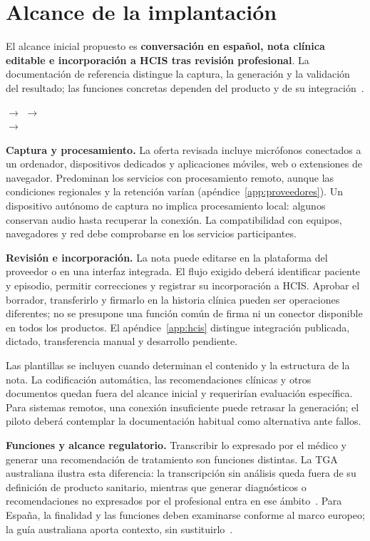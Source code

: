 \section{Alcance de la implantación}
\label{sec:flujo}
El alcance inicial propuesto es \textbf{conversación en español, nota clínica editable e incorporación a HCIS tras revisión profesional}. La documentación de referencia distingue la captura, la generación y la validación del resultado; las funciones concretas dependen del producto y de su integración~\cite{7MXFHMBA,nhsAmbient2025}.

\begin{center}
\small
{} $\longrightarrow$ 
$\longrightarrow$ \\[6pt]
$\longrightarrow$ 
\end{center}

\textbf{Captura y procesamiento.} La oferta revisada incluye micrófonos conectados a un ordenador, dispositivos dedicados y aplicaciones móviles, web o extensiones de navegador. Predominan los servicios con procesamiento remoto, aunque las condiciones regionales y la retención varían (apéndice~\ref{app:proveedores}). Un dispositivo autónomo de captura no implica procesamiento local: algunos conservan audio hasta recuperar la conexión. La compatibilidad con equipos, navegadores y red debe comprobarse en los servicios participantes.

\textbf{Revisión e incorporación.} La nota puede editarse en la plataforma del proveedor o en una interfaz integrada. El flujo exigido deberá identificar paciente y episodio, permitir correcciones y registrar su incorporación a HCIS. Aprobar el borrador, transferirlo y firmarlo en la historia clínica pueden ser operaciones diferentes; no se presupone una función común de firma ni un conector disponible en todos los productos. El apéndice~\ref{app:hcis} distingue integración publicada, dictado, transferencia manual y desarrollo pendiente.

Las plantillas se incluyen cuando determinan el contenido y la estructura de la nota. La codificación automática, las recomendaciones clínicas y otros documentos quedan fuera del alcance inicial y requerirían evaluación específica. Para sistemas remotos, una conexión insuficiente puede retrasar la generación; el piloto deberá contemplar la documentación habitual como alternativa ante fallos.

\textbf{Funciones y alcance regulatorio.} Transcribir lo expresado por el médico y generar una recomendación de tratamiento son funciones distintas. La TGA australiana ilustra esta diferencia: la transcripción sin análisis queda fuera de su definición de producto sanitario, mientras que generar diagnósticos o recomendaciones no expresados por el profesional entra en ese ámbito~\cite{tgaScribes2026}. Para España, la finalidad y las funciones deben examinarse conforme al marco europeo; la guía australiana aporta contexto, sin sustituirlo~\cite{mdcg2019rev2025}.
